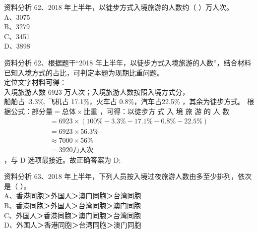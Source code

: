 \documentclass[aspectratio=169]{beamer}
\begin{document}
\begin{frame}[t]{资料分析}
    62、2018 年上半年，以徒步方式入境旅游的人数约（ ）万人次。\\
    A、3075                                                   \\
    B、3279                                                   \\
    C、3451                                                   \\
    D、3898                                                   \\
\end{frame}                           

\begin{frame}[t]{资料分析}
    62、根据题干“2018 年上半年，以徒步方式入境旅游的人数”，结合材料已知入境方式的占比，可判定本题为现期比重问题。\\

    定位文字材料可得：\\
    入境旅游人数 6923 万人次；入境旅游人数按照入境方式分，\\
    船舶占 .3.3\%, 飞机占 17.1\%，火车占 0.8\%，汽车占22.5\% ，其余为徒步方式。
    根据公式：$\text{部分量} = \text{总体} \times \text{比重}$
    ，可得：以徒步方 式 入 境 旅 游 的 人 数
    \begin{gather}
        = 6923 \times (100\% -3.3\% -17.1\% -0.8\% -22.5\%)\\
        =  6923 \times 56.3\% \\
        \approx 7000 \times 56\% \\
        = 3920 \text{万人次}
    \end{gather}
    ，与 D 选项最接近。故正确答案为 D;
\end{frame}                           


\begin{frame}[t]{资料分析}
    63、2018 年上半年，下列人员按入境过夜旅游人数由多至少排列，依次是（ ）。 \\
    A、香港同胞＞外国人＞澳门同胞＞台湾同胞                                  \\
    B、香港同胞＞外国人＞台湾同胞＞澳门同胞                                  \\
    C、外国人＞香港同胞＞澳门同胞＞台湾同胞                                  \\
    D、外国人＞香港同胞＞台湾同胞＞澳门同胞                                  \\
\end{frame}                           
\end{document}
